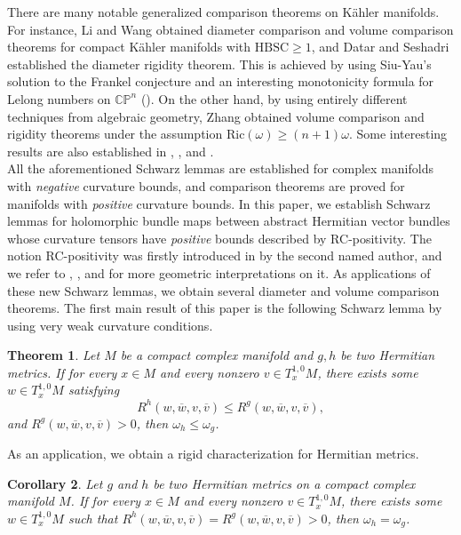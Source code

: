 \documentclass[12pt]{amsart}
\theoremstyle{plain}
\newtheorem{thm}{Theorem}[section]
\newtheorem{cor}[thm]{Corollary}
\theoremstyle{definition}
\newcommand{\btheorem}{\begin{thm}}
\newcommand{\etheorem}{\end{thm}}
\newcommand{\bcorollary}{\begin{cor}}
\newcommand{\ecorollary}{\end{cor}}
\renewcommand{\bar}{\overline}
\newcommand{\beq}{\begin{equation}}
\newcommand{\eeq}{\end{equation}}
\renewcommand{\>}{\rightarrow}
\newcommand{\C}{{\mathbb C}}
\renewcommand{\P}{{\mathbb P}}
\newcommand{\om}{\omega}
\numberwithin{equation}{section} %
\begin{document}
There are many notable generalized comparison theorems on K\"ahler manifolds. 
For instance, Li and Wang \cite{LW05} obtained diameter comparison and volume comparison theorems for compact K\"ahler manifolds with $\mathrm{HBSC}\geq 1$, and  Datar and Seshadri \cite{DS23} established the diameter rigidity theorem. This is achieved by using Siu-Yau's solution to the Frankel conjecture \cite{SY80} and an interesting monotonicity formula for Lelong numbers on $\C\P^n$ (\cite{Lot21}). On the other hand, by using entirely different techniques from algebraic geometry, 
Zhang \cite{Zha22} obtained volume comparison and rigidity theorems under the assumption $\mathrm{Ric}(\om)\ge (n+1)\om$. Some interesting results are also established in \cite{TY12}, \cite{LY18}, \cite{NZ18} and \cite{XY24+}.\\



All the aforementioned Schwarz lemmas  are established  for  complex  manifolds with  \emph{negative} curvature bounds, and comparison theorems are proved for manifolds with \emph{positive} curvature bounds.  In this paper, we establish  Schwarz lemmas for holomorphic bundle maps between abstract Hermitian  vector bundles whose curvature tensors have  \emph{positive}  bounds described by  RC-positivity. The notion RC-positivity was firstly introduced  in \cite{Yan2018} by the second named author,  and we refer to  \cite{Yan2018}, \cite{Yang17}, \cite{Yang18b} and \cite{Yan24} for more geometric interpretations on it.  As applications of these new Schwarz lemmas, we obtain several diameter  and volume comparison theorems.  The first main result of this paper is the following Schwarz lemma by using very weak curvature conditions.

\btheorem\label{thm0}   Let $M$ be a compact complex  manifold and $g, h$ be two Hermitian metrics. 
If for every $x\in M$ and every nonzero $v\in T_x^{1,0}M$, there exists some $w\in T_x^{1,0}M$ satisfying
\beq
R^h\left(w,\bar{w},v,\bar{v}\right)\le  R^g\left(w,\bar w,v,\bar v\right), 
\eeq and  $R^{g}\left(w,\bar w,v,\bar v\right)>0$, 
then $\om_h\leq \om_g$.
\etheorem
\noindent As an application, we obtain a rigid characterization for Hermitian  metrics.
\bcorollary   Let $g$ and $ h$ be two Hermitian metrics on a compact complex manifold $M$. 
If for every $x\in M$ and every nonzero $v\in T_x^{1,0}M$, there exists some $w\in T_x^{1,0}M$ such that $R^h\left(w,\bar{w},v,\bar{v}\right)=  R^g\left(w,\bar w,v,\bar v\right)>0$,
then $\om_h=\om_g$.
\ecorollary 
\end{document}
